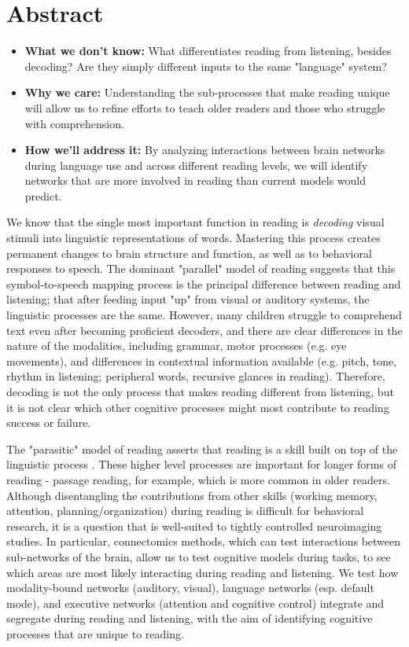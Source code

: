 \chapter{Abstract}

\begin{itemize}
	\item \textbf{What we don't know:} What differentiates reading from listening, besides decoding? Are they simply different inputs to the same "language" system?
	\item \textbf{Why we care:} Understanding the sub-processes that make reading unique will allow us to refine efforts to teach older readers and those who struggle with comprehension.
	\item \textbf{How we'll address it:} By analyzing interactions between brain networks during language use and across different reading levels, we will identify networks that are more involved in reading than current models would predict. 
\end{itemize}

We know that the single most important function in reading is \textit{decoding} visual stimuli into linguistic representations of words. Mastering this process creates permanent changes to brain structure and function, as well as to behavioral responses to speech. The dominant "parallel" model of reading suggests that this symbol-to-speech mapping process is the principal difference between reading and listening; that after feeding input "up" from visual or auditory systems, the linguistic processes are the same. However, many children struggle to comprehend text even after becoming proficient decoders, and there are clear differences in the nature of the modalities, including grammar, motor processes (e.g. eye movements), and differences in contextual information available (e.g. pitch, tone, rhythm in listening; peripheral words, recursive glances in reading). Therefore, decoding is not the only process that makes reading different from listening, but it is not clear which other cognitive processes might most contribute to reading success or failure. 

The "parasitic" model of reading asserts that reading is a skill built on top of the linguistic process \citep{Mattingly1972}. These higher level processes are important for longer forms of reading - passage reading, for example, which is more common in older readers. Although disentangling the contributions from other skills (working memory, attention, planning/organization) during reading is difficult for behavioral research, it is a question that is well-suited to tightly controlled neuroimaging studies. In particular, connectomics methods, which can test interactions between sub-networks of the brain, allow us to test cognitive models during tasks, to see which areas are most likely interacting during reading and listening. We test how modality-bound networks (auditory, visual), language networks (esp. default mode), and executive networks (attention and cognitive control) integrate and segregate during reading and listening, with the aim of identifying cognitive processes that are unique to reading.

